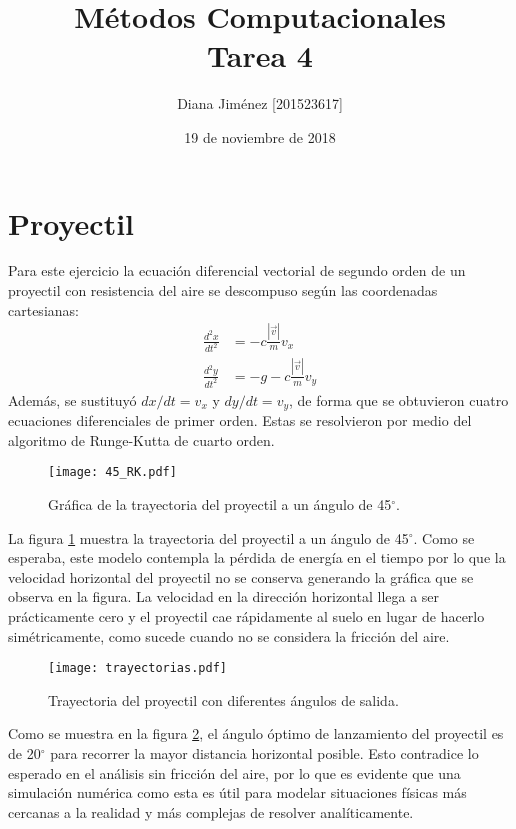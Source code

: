 \documentclass[10pt, twocolumn]{article}
\begin{document}
\title{Métodos Computacionales \\
\small{Tarea 4}}


\author{Diana Jiménez [201523617]}

\date{19 de noviembre de 2018}


\maketitle


\section{Proyectil}
Para este ejercicio la ecuación diferencial vectorial de segundo orden de un proyectil con resistencia del aire se descompuso según las coordenadas cartesianas:
\begin{align*}
    \frac{d^2x}{dt^2} &= -c\frac{|\vec{v}|}{m}v_x \\ \frac{d^2y}{dt^2} &= -g - c\frac{|\vec{v}|}{m}v_y
\end{align*}
Además, se sustituyó $dx/dt = v_x$ y $dy/dt = v_y$, de forma que se obtuvieron cuatro ecuaciones diferenciales de primer orden. Estas se resolvieron por medio del algoritmo de Runge-Kutta de cuarto orden.
\begin{figure}[h]
\centering
\texttt{[image: 45\_RK.pdf]}
\caption{Gráfica de la trayectoria del proyectil a un ángulo de 45$^\circ$.}
\label{angulo45}
\end{figure}
La figura \ref{angulo45} muestra la trayectoria del proyectil a un ángulo de 45$^\circ$. Como se esperaba, este modelo contempla la pérdida de energía en el tiempo por lo que la velocidad horizontal del proyectil no se conserva generando la gráfica que se observa en la figura. La velocidad en la dirección horizontal llega a ser prácticamente cero y el proyectil cae rápidamente al suelo en lugar de hacerlo simétricamente, como sucede cuando no se considera la fricción del aire.

\begin{figure}[h]
\centering
\texttt{[image: trayectorias.pdf]}
\caption{Trayectoria del proyectil con diferentes ángulos de salida.}
\label{trayectorias}
\end{figure}

Como se muestra en la figura \ref{trayectorias}, el ángulo óptimo de lanzamiento del proyectil es de 20$^\circ$ para recorrer la mayor distancia horizontal posible. Esto contradice lo esperado en el análisis sin fricción del aire, por lo que es evidente que una simulación numérica como esta es útil para modelar situaciones físicas más cercanas a la realidad y más complejas de resolver analíticamente.
\end{document}
